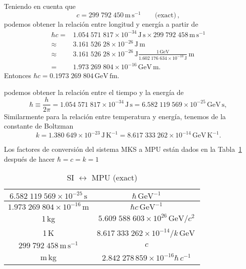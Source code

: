 \begin{frame}
Teniendo en cuenta que \cite{PDG}
\begin{equation}
    c=299\;792\;450\,\text{m}\,\text{s}^{-1}\qquad\text{(exact)}\,,
\end{equation}
podemos obtener la relación entre longitud y energía a partir de
\begin{align}
  \hbar c=&1.054\;571\;817\times10^{-34}\,\text{J}\,\text{s}\times299\;792\;458\,\text{m}\,\text{s}^{-1} \nonumber\\
  \approx&3.161\;526\;28\times10^{-26}\,\text{J}\,\text{m}\nonumber\\
  \approx&3.161\;526\;28\times10^{-26}\,{\text{J}}\frac{1\,\text{GeV}}{1.602\;176\;634\times10^{-10}\,\text{J}}\,\text{m}\nonumber\\
  =&1.973\;269\;804\times10^{-16}\,\text{GeV}\,\text{m}.
\end{align}
Entonces $\hbar c =0.1973\;269\;804\,\text{GeV}\,\text{fm}$.

podemos obtener la relación entre el tiempo y la energía de
\begin{equation}
  \hbar\equiv\frac{h}{2\pi}=1.054\;571\;817\times10^{-34}\,\text{J}\,\text{s}
  =6.582\;119\;569\times10^{-25}\,\text{GeV}\,\text{s},
\end{equation}
Similarmente para la relación entre temperatura y energía, tenemos de la constante de Boltzman
\begin{equation}
  k=1.380\;649\times10^{-23}\,\text{J}\,\text{K}^{-1}=8.617\;333\;262\times10^{-14}\,\text{GeV}\,\text{K}^{-1}.
\end{equation}


Los factores de conversión del sistema MKS a MPU están dados en la Tabla~\ref{tab:mks2mpu} después de hacer $\hbar=c=k=1$

\begin{table} %
  \centering %
  \begin{tabular}{c|c} %
$6.582\;119\;569\times10^{-25}\,\text{s}$ & $ {\hbar}\,\text{GeV}^{-1}$\\\hline
$1.973\;269\;804\times10^{-16}\,\text{m}$ & $ {\hbar c}\,\text{GeV}^{-1} $\\ \hline
1\,kg& $5.609\;588\;603\times10^{26}\,\text{GeV}/c^2$ \\ \hline
1\,K & $8.617\;333\;262\times10^{-14}/k\,\text{GeV}$\,\\ \hline
$299\;792\;458\,\text{m}\,\text{s}^{-1}$&$c$\\ \hline
m\,kg&$2.842\;278\,859\times10^{-16}\hbar\,c^{-1}$\\ \hline
  \end{tabular} %
  \caption{SI $\leftrightarrow$ MPU (exact)} %
  \label{tab:mks2mpu} %
\end{table} %



\end{frame}
